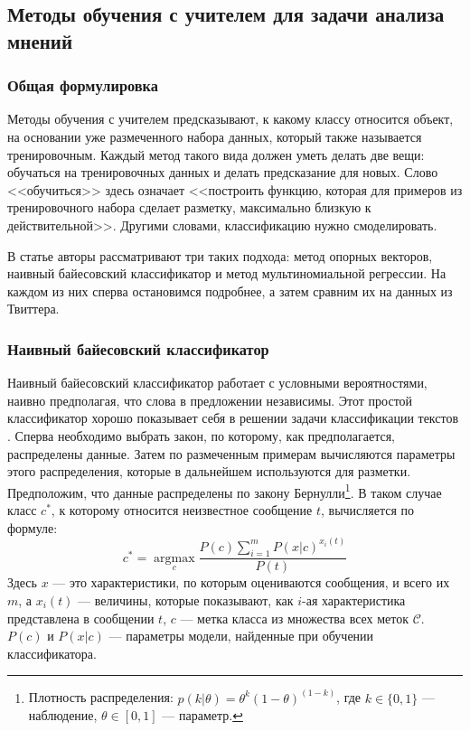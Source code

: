 \subsection{Методы обучения с учителем для задачи анализа мнений}

\subsubsection{Общая формулировка}
Методы обучения с учителем предсказывают, к какому классу относится объект, на основании уже
размеченного набора данных, который также называется тренировочным. Каждый метод такого вида должен
уметь делать две вещи: обучаться на тренировочных данных и делать предсказание для новых. Слово
<<обучиться>> здесь означает <<построить функцию, которая для примеров из тренировочного набора
сделает разметку, максимально близкую к действительной>>. Другими словами, классификацию нужно смоделировать.

В статье \cite{pang2002thumbs} авторы рассматривают три таких подхода: метод опорных
векторов, наивный байесовский классификатор и метод мультиномиальной регрессии. На каждом из них
сперва остановимся подробнее, а затем сравним их на данных из Твиттера.

\subsubsection{Наивный байесовский классификатор}
Наивный байесовский классификатор \cite{citeulike:11350907} работает с условными вероятностями,
наивно предполагая, что слова в предложении независимы. Этот простой классификатор хорошо показывает
себя в решении задачи классификации текстов \cite{manning1999foundations}. Сперва необходимо выбрать закон,
по которому, как предполагается, распределены данные. Затем по размеченным примерам вычисляются
параметры этого распределения, которые в дальнейшем используются для разметки. Предположим, что данные
распределены по закону Бернулли\footnote{
  Плотность распределения: $p(k|\theta) = \theta^k(1-\theta)^{(1-k)}$, где $k\in\{0,1\}$ --- наблюдение, $\theta \in [0,1]$ --- параметр.
}. В таком случае класс $c^*$, к которому относится
неизвестное сообщение $t$, вычисляется по формуле:
\begin{equation}
c^* = \underset{c}{\operatorname{arg max}} \frac{P(c) \sum\limits_{i=1}^m P(x|c)^{x_i(t)}}{P(t)}
\end{equation}
Здесь $x$ --- это характеристики, по которым оцениваются сообщения, и всего их $m$, а $x_i(t)$ --- величины, которые
показывают, как $i$-ая характеристика представлена в сообщении $t$, $c$ --- метка
класса из множества всех меток $\mathcal{C}$. $P(c)$ и $P(x|c)$ --- параметры
модели, найденные при обучении классификатора.

